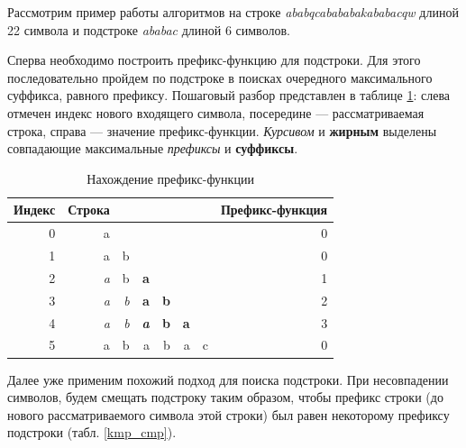 \documentclass[a4paper,12pt]{article}
\begin{document}
Рассмотрим пример работы алгоритмов на
строке \textit{ababqcabababakababacqw} длиной 22 символа
и подстроке \textit{ababac} длиной 6 символов.

Сперва необходимо построить префикс-функцию для подстроки. Для этого
последовательно пройдем по подстроке в поисках очередного максимального суффикса,
равного префиксу. Пошаговый разбор представлен в таблице \ref{pref}:
слева отмечен индекс нового входящего символа, посередине ---
рассматриваемая строка, справа --- значение префикс-функции.
\textit{Курсивом} и \textbf{жирным} выделены совпадающие максимальные
\textit{префиксы} и \textbf{суффиксы}.

\begin{table} [h!]
	\begin{center}
		\caption{Нахождение префикс-функции}
		\begin{tabular}{|r|rrrrrr|r|}
			\hline
			Индекс & Строка & & & & & & Префикс-функция \\
			\hline
			0 &          a &            &            &            &            &            &          0 \\
			
			1 &          a &          b &            &            &            &            &          0 \\
			
			2 &    {\it a} &          b &    {\bf a} &            &            &            &          1 \\
			
			3 &    {\it a} &    {\it b} &    {\bf a} &    {\bf b} &            &            &          2 \\
			
			4 &    {\it a} &    {\it b} & {\itshape \bf a} &    {\bf b} &    {\bf a} &            &          3 \\
			
			5 &          a &          b &          a &          b &          a &          c &          0 \\
			\hline
		\end{tabular}
		\label{pref}
	\end{center}
\end{table}  

Далее уже применим похожий подход для поиска подстроки.
При несовпадении символов, будем смещать подстроку таким образом, чтобы 
префикс строки (до нового рассматриваемого символа этой строки) был равен
некоторому префиксу подстроки (табл. \ref{kmp_cmp}).
\end{document}
